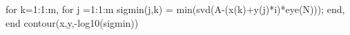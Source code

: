 for k=1:1:m, for j =1:1:m 
	sigmin(j,k) = min(svd(A-(x(k)+y(j)*i)*eye(N)));
end, end
contour(x,y,-log10(sigmin))
